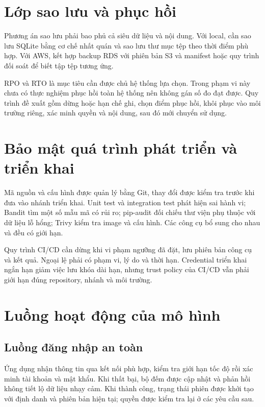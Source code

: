 \section{Lớp sao lưu và phục hồi}
Phương án sao lưu phải bao phủ cả siêu dữ liệu và nội dung. Với local, cần sao lưu SQLite bằng cơ chế nhất quán và sao lưu thư mục tệp theo thời điểm phù hợp. Với AWS, kết hợp backup RDS với phiên bản S3 và manifest hoặc quy trình đối soát để biết tập tệp tương ứng.

RPO và RTO là mục tiêu cần được chủ hệ thống lựa chọn. Trong phạm vi này chưa có thực nghiệm phục hồi toàn hệ thống nên không gán số đo đạt được. Quy trình đề xuất gồm dừng hoặc hạn chế ghi, chọn điểm phục hồi, khôi phục vào môi trường riêng, xác minh quyền và nội dung, sau đó mới chuyển sử dụng.

\section{Bảo mật quá trình phát triển và triển khai}
Mã nguồn và cấu hình được quản lý bằng Git, thay đổi được kiểm tra trước khi đưa vào nhánh triển khai. Unit test và integration test phát hiện sai hành vi; Bandit tìm một số mẫu mã có rủi ro; pip-audit đối chiếu thư viện phụ thuộc với dữ liệu lỗ hổng; Trivy kiểm tra image và cấu hình. Các công cụ bổ sung cho nhau và đều có giới hạn.

Quy trình CI/CD cần dừng khi vi phạm ngưỡng đã đặt, lưu phiên bản công cụ và kết quả. Ngoại lệ phải có phạm vi, lý do và thời hạn. Credential triển khai ngắn hạn giảm việc lưu khóa dài hạn, nhưng trust policy của CI/CD vẫn phải giới hạn đúng repository, nhánh và môi trường.

\section{Luồng hoạt động của mô hình}
\subsection{Luồng đăng nhập an toàn}
Ứng dụng nhận thông tin qua kết nối phù hợp, kiểm tra giới hạn tốc độ rồi xác minh tài khoản và mật khẩu. Khi thất bại, bộ đếm được cập nhật và phản hồi không tiết lộ dữ liệu nhạy cảm. Khi thành công, trạng thái phiên được khởi tạo với định danh và phiên bản hiện tại; quyền được kiểm tra lại ở các yêu cầu sau.
